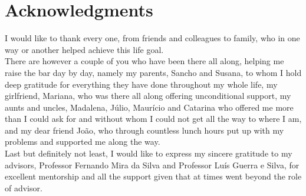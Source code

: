 
\chapter*{Acknowledgments}
I would like to thank every one, from friends and colleagues to family, who in one way or another helped achieve this life goal.\\
There are however a couple of you who have been there all along, helping me raise the bar day by day, namely my parents, Sancho and Susana, to whom I hold deep gratitude for everything they have done throughout my whole life, my girlfriend, Mariana, who was there all along offering unconditional support, my aunts and uncles, Madalena, Júlio, Maurício and Catarina who offered me more than I could ask for and without whom I could not get all the way to where I am, and my dear friend João, who through countless lunch hours put up with my problems and supported me along the way.\\
Last but definitely not least, I would like to express my sincere gratitude to my advisors, Professor Fernando Mira da Silva and Professor Luís Guerra e Silva, for excellent mentorship and all the support given that at times went beyond the role of advisor.